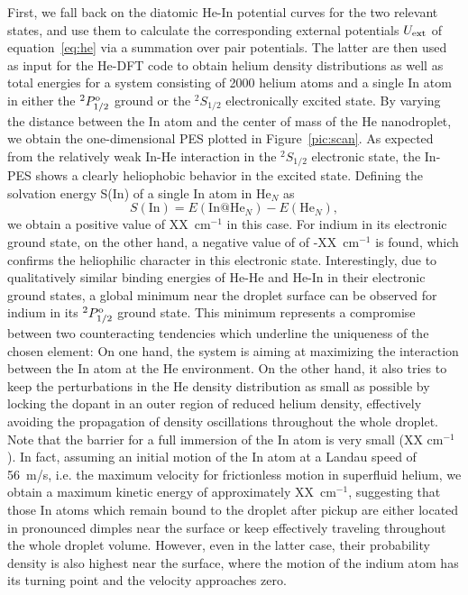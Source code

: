 \documentclass[twoside,twocolumn,9pt]{article}
\begin{document}
First, we fall back on the diatomic He-In potential curves for the two relevant states, and use them to calculate the corresponding external potentials $U_{\rm ext}$ of equation~\ref{eq:he} via a summation over pair potentials. The latter are then used as input for the He-DFT code to obtain helium density distributions as well as total energies for a system consisting of 2000 helium atoms and a single In atom in either the $^2P^{\rm o}_{1/2}$ ground or the $^2S_{1/2}$ electronically excited state. By varying the distance between the In atom and the center of mass of the He nanodroplet, we obtain the one-dimensional PES plotted in Figure~\ref{pic:scan}. As expected from the relatively weak In-He interaction in the $^2S_{1/2}$ electronic state, the In- PES shows a clearly heliophobic behavior in the excited state. Defining the solvation energy S(In) of a single In atom in He$_N$ as
\begin{equation}
  \label{eq:solv}
S(\mathrm{In}) = E(\mathrm{In@He}_{N}) - E(\mathrm{He}_{N}),
\end{equation}
we obtain a positive value of XX~cm$^{-1}$ in this case. For indium in its electronic ground state, on the other hand, a negative value of of -XX~cm$^{-1}$ is found, which confirms the heliophilic character in this electronic state. Interestingly, due to qualitatively similar binding energies of He-He and He-In in their electronic ground states, a global minimum near the droplet surface can be observed for indium in its $^2P^{\rm o}_{1/2}$  ground state. This minimum represents a compromise between two counteracting tendencies which underline the uniqueness of the chosen element: On one hand, the system is aiming at maximizing the interaction between the In atom at the He environment. On the other hand, it also tries to keep the perturbations in the He density distribution as small as possible by locking the dopant in an outer region of reduced helium density, effectively avoiding the propagation of density oscillations throughout the whole droplet. Note that the barrier for a full immersion of the In atom is very small (XX cm$^{-1}$). In fact, assuming an initial motion of the In atom at a Landau speed of 56~m/s, i.e. the maximum velocity for frictionless motion in superfluid helium,  we obtain a maximum kinetic energy of approximately XX~cm$^{-1}$, suggesting that those In atoms which remain bound to the droplet after pickup are either located in pronounced dimples near the surface or keep effectively traveling throughout the whole droplet volume. However, even in the latter case, their probability density is also highest near the surface, where the motion of the indium atom has its turning point and the velocity approaches zero.\cite{Hauser:2015cba}
\end{document}
